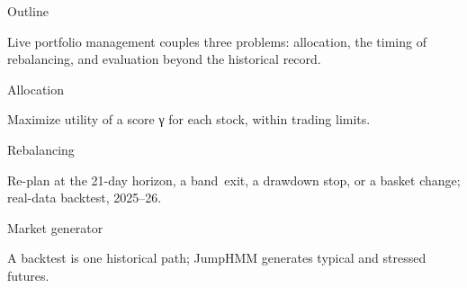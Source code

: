 \begin{frame}{Outline}
  \begingroup\raggedright Live portfolio management couples three problems: allocation, the timing of rebalancing, and evaluation beyond the historical record.\par\endgroup
  \vspace{20pt}
  \noindent{}%
  \parbox[t]{4.2cm}{\raggedright\vnmedium\fontsize{13}{15.6}\selectfont\leavevmode\color{vnslideink}Allocation}%
  \parbox[t]{8.9cm}{\raggedright\small\leavevmode{} Maximize utility of a
    score γ for each stock, within trading limits.}\par
  \vspace{14pt}
  \noindent{}%
  \parbox[t]{4.2cm}{\raggedright\vnmedium\fontsize{13}{15.6}\selectfont\leavevmode\color{vnslideink}Rebalancing}%
  \parbox[t]{8.9cm}{\raggedright\small\leavevmode{} Re-plan at the 21-day
    horizon, a band~exit, a drawdown stop, or a basket change; real-data backtest, 2025–26.}\par
  \vspace{14pt}
  \noindent{}%
  \parbox[t]{4.2cm}{\raggedright\vnmedium\fontsize{13}{15.6}\selectfont\leavevmode\color{vnslideink}Market
    generator}%
  \parbox[t]{8.9cm}{\raggedright\small\leavevmode{} A backtest is one
    historical path; JumpHMM generates typical and stressed futures.}\par
\end{frame}
